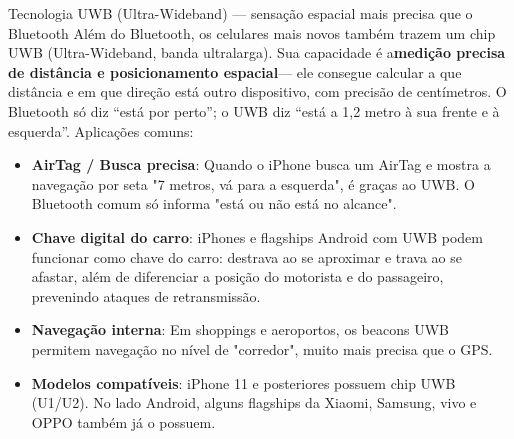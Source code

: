 \begin{tcbinfo}{Tecnologia UWB (Ultra-Wideband) — sensação espacial mais precisa que o Bluetooth}
Além do Bluetooth, os celulares mais novos também trazem um chip UWB (Ultra-Wideband, banda ultralarga). Sua capacidade é a\textbf{medição precisa de distância e posicionamento espacial}— ele consegue calcular a que distância e em que direção está outro dispositivo, com precisão de centímetros. O Bluetooth só diz “está por perto”; o UWB diz “está a 1,2 metro à sua frente e à esquerda”. Aplicações comuns:

\begin{itemize}
  \item \textbf{AirTag / Busca precisa}: Quando o iPhone busca um AirTag e mostra a navegação por seta "7 metros, vá para a esquerda", é graças ao UWB. O Bluetooth comum só informa "está ou não está no alcance".
  \item \textbf{Chave digital do carro}: iPhones e flagships Android com UWB podem funcionar como chave do carro: destrava ao se aproximar e trava ao se afastar, além de diferenciar a posição do motorista e do passageiro, prevenindo ataques de retransmissão.
  \item \textbf{Navegação interna}: Em shoppings e aeroportos, os beacons UWB permitem navegação no nível de "corredor", muito mais precisa que o GPS.
  \item \textbf{Modelos compatíveis}: iPhone 11 e posteriores possuem chip UWB (U1/U2). No lado Android, alguns flagships da Xiaomi, Samsung, vivo e OPPO também já o possuem.
\end{itemize}

\end{tcbinfo}

